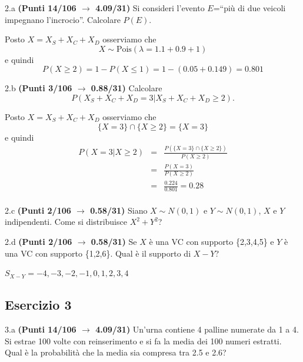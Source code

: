 \documentclass[
  11pt,
]{book}
\theoremstyle{mytheoremstyle}
\theoremstyle{mydefstyle}
\newenvironment{sol}
  {
  \begin{tcolorbox}[enhanced,breakable,arc=0.1mm,boxrule=1pt,colback=white,colframe=iblue,
  title=\bf \fontfamily{lmss}\selectfont \hspace{.5 cm} Soluzione,drop fuzzy shadow]

}{
\end{tcolorbox}
  }
\begin{document}
2.a \textbf{(Punti 14/106 \(\rightarrow\) 4.09/31)} Si consideri l'evento \(E\)=``più di due veicoli
impegnano l'incrocio''. Calcolare \(P(E)\).

\begin{sol}
Posto \(X=X_S+X_C+X_D\) osserviamo che
\[X\sim\text{Pois}(\lambda=1.1+0.9+1)\]
e quindi
\[P(X\ge 2)=1-P(X\le 1)=1-(0.05+0.149)=0.801\]

\end{sol}

2.b \textbf{(Punti 3/106 \(\rightarrow\) 0.88/31)} Calcolare
\[
P(X_S+X_C+X_D=3|X_S+X_C+X_D\ge 2).
\]

\begin{sol}
Posto \(X=X_S+X_C+X_D\) osserviamo che
\[\{X=3\}\cap\{X \ge 2\}=\{X=3\}\]
e quindi
\begin{eqnarray*}
  P(X=3|X\ge 2) &=&  \frac{P(\{X=3\}\cap\{X \ge 2\})}{P(X \ge 2)}\\
  &=&\frac{P(X=3)}{P(X \ge 2)}\\
  &=&\frac{0.224}{0.801}=0.28\\
\end{eqnarray*}

\end{sol}

2.c \textbf{(Punti 2/106 \(\rightarrow\) 0.58/31)} Siano \(X\sim N(0,1)\) e \(Y\sim N(0,1)\), \(X\) e \(Y\) indipendenti.
Come si distribuisce \(X^2+Y^2\)?

2.d \textbf{(Punti 2/106 \(\rightarrow\) 0.58/31)} Se \(X\) è una VC con supporto \{2,3,4,5\} e \(Y\) è una VC con supporto
\{1,2,6\}.
Qual è il supporto di \(X-Y\)?

\begin{sol}
\(S_{X-Y}=-4, -3, -2, -1, 0, 1, 2, 3, 4\)

\end{sol}

\subsection{Esercizio 3}\label{esercizio-3-16}

3.a \textbf{(Punti 14/106 \(\rightarrow\) 4.09/31)} Un'urna contiene 4 palline numerate da 1 a 4.
Si estrae 100 volte con reinserimento e si fa la media dei 100 numeri
estratti. Qual è la probabilità che la media sia compresa tra 2.5 e 2.6?
\end{document}

